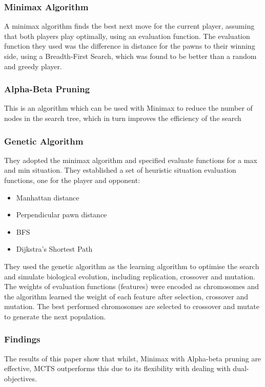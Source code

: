 \documentclass[review]{cmpreport}
\begin{document}
\subsubsection{Minimax Algorithm}
A minimax algorithm finds the best next move for the current player, assuming that both players play optimally, using an evaluation function. The evaluation function they used was the difference in distance for the pawns to their winning side, using a Breadth-First Search, which was found to be better than a random and greedy player.

\subsubsection{Alpha-Beta Pruning}
This is an algorithm which can be used with Minimax to reduce the number of nodes in the search tree, which in turn improves the efficiency of the search

\subsubsection{Genetic Algorithm}
They adopted the minimax algorithm and specified evaluate functions for a max and min situation. They established a set of heuristic situation evaluation functions, one for the player and opponent:
\begin{itemize}
    \item Manhattan distance
    \item Perpendicular pawn distance
    \item BFS
    \item Dijkstra's Shortest Path
\end{itemize}

They used the genetic algorithm as the learning algorithm to optimise the search and simulate biological evolution, including replication, crossover and mutation. The weights of evaluation functions (features) were encoded as chromosomes and the algorithm learned the weight of each feature after selection, crossover and mutation. The best performed chromosomes are selected to crossover and mutate to generate the next population.

\subsubsection{Findings}
The results of this paper show that whilst, Minimax with Alpha-beta pruning are effective, MCTS outperforms this due to its flexibility with dealing with dual-objectives.
\end{document}
